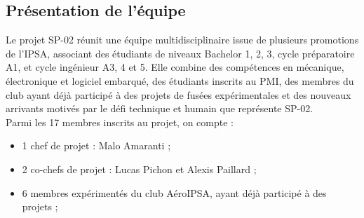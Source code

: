 \subsection{Présentation de l'équipe}
\label{subsec:pres_equipe}

Le projet SP-02 réunit une équipe multidisciplinaire issue de plusieurs promotions de l’\acrshort{IPSA}, associant des étudiants
de niveaux Bachelor 1, 2, 3, cycle préparatoire A1, et cycle ingénieur A3, 4 et 5. Elle combine des compétences en mécanique,
électronique et logiciel embarqué, des étudiants inscrits au \acrshort{PMI}, des membres du club ayant déjà participé à des
projets de fusées expérimentales et des nouveaux arrivants motivés par le défi technique et humain que représente SP-02.\\

Parmi les 17 membres inscrits au projet, on compte :
\begin{itemize}
    \item 1 chef de projet : Malo Amaranti ;
    \item 2 co-chefs de projet : Lucas Pichon et Alexis Paillard ;
    \item 6 membres expérimentés du club AéroIPSA, ayant déjà participé à des projets ;
\end{itemize}